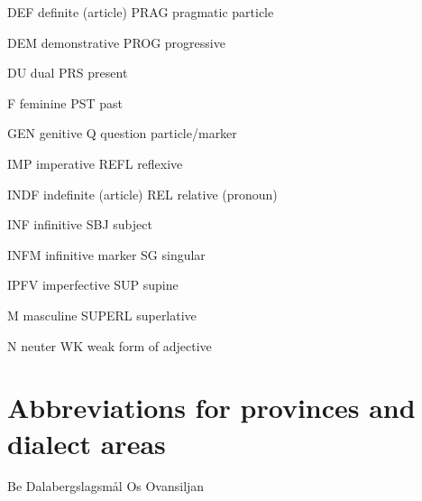 DEF  definite (article)  PRAG  pragmatic particle


DEM  demonstrative  PROG  progressive


DU  dual  PRS  present


F  feminine  PST  past


GEN  genitive  Q  question particle/marker


IMP  imperative  REFL  reflexive


INDF  indefinite (article)  REL  relative (pronoun)


INF  infinitive  SBJ  subject


INFM  infinitive marker  SG  singular


IPFV  imperfective  SUP  supine


M  masculine  SUPERL  superlative


N  neuter  WK  weak form of adjective


\section[Abbreviations for provinces and dialect areas]{\rmfamily Abbreviations for provinces and dialect areas}
Be  Dalabergslagsmål  Os  Ovansiljan


